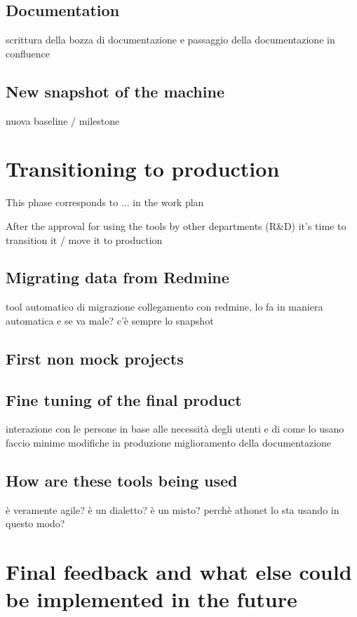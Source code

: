 	\subsection{Documentation}
		scrittura della bozza di documentazione e passaggio della documentazione in confluence
		
	\subsection{New snapshot of the machine}
		nuova baseline / milestone

\section{Transitioning to production}

	This phase corresponds to ... in the work plan

	After the approval for using the tools by other departments (R\&D) it's time to transition it / move it to production
	
	\subsection{Migrating data from Redmine}
		tool automatico di migrazione
		collegamento con redmine, lo fa in maniera automatica
		e se va male? c'è sempre lo snapshot
	
	\subsection{First non mock projects}
	
	\subsection{Fine tuning of the final product}
		interazione con le persone
		in base alle necessità degli utenti e di come lo usano faccio minime modifiche in produzione
		miglioramento della documentazione
	
	\subsection{How are these tools being used}
		è veramente agile? 
		è un dialetto?
		è un misto?
		perchè athonet lo sta usando in questo modo?

\section{Final feedback and what else could be implemented in the future}

